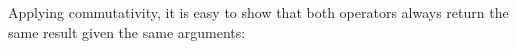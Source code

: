 \begin{fence}
\begin{code}%
\>[0]\AgdaSpace{}%
\AgdaSymbol{:}\AgdaSpace{}%
\AgdaSpace{}%
\AgdaSpace{}%
\AgdaSpace{}%
\AgdaSpace{}%
\<%
\\
\>[0]\AgdaSpace{}%
\AgdaSpace{}%
%
\>[11]\AgdaSymbol{=}\AgdaSpace{}%
\<%
\\
\>[0]\AgdaSpace{}%
\AgdaSpace{}%
\AgdaSpace{}%
\AgdaSpace{}%
\AgdaSymbol{=}\AgdaSpace{}%
\AgdaSpace{}%
\AgdaSymbol{(}\AgdaSpace{}%
\AgdaSpace{}%
\AgdaSymbol{)}\<%
\end{code}
\end{fence}

Applying commutativity, it is easy to show that both operators always
return the same result given the same arguments:

